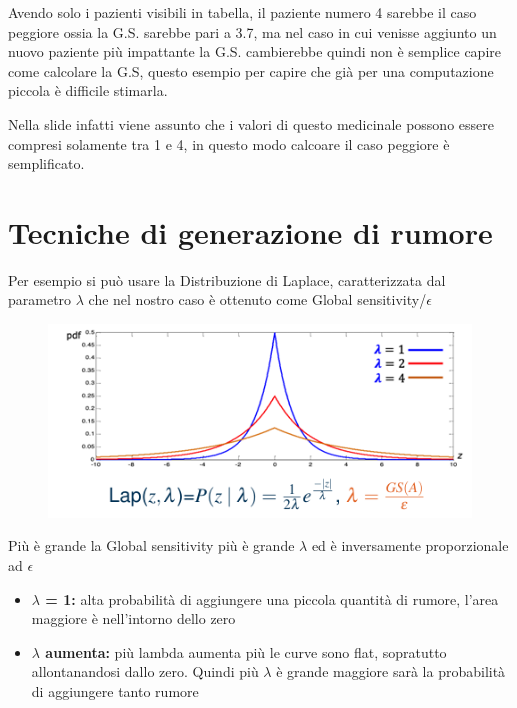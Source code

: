 \documentclass{report}
\begin{document}
\noindent Avendo solo i pazienti visibili in tabella, il paziente numero 4 sarebbe il caso peggiore ossia la G.S. sarebbe pari a 3.7, ma nel caso in cui venisse aggiunto un nuovo paziente
più impattante la G.S. cambierebbe quindi non è semplice capire come calcolare la G.S, questo esempio per capire che già per una computazione piccola è difficile stimarla.

\noindent Nella slide infatti viene assunto che i valori di questo medicinale possono essere compresi solamente tra 1 e 4, in questo modo calcoare il caso peggiore è semplificato.

\section{Tecniche di generazione di rumore}
Per esempio si può usare la Distribuzione di Laplace, caratterizzata dal parametro $\lambda$ che nel nostro caso 
è ottenuto come Global sensitivity/$\epsilon$

\begin{figure}[H]
        \centering
        \includegraphics[width=0.4\linewidth]{images/Laplace.png}
    \end{figure}
\noindent Più è grande la Global sensitivity più è grande $\lambda$ ed è inversamente proporzionale ad $\epsilon$ 
\begin{itemize}
    \item \textbf{$\lambda$ = 1:} alta probabilità di aggiungere una piccola quantità di rumore, l'area maggiore è nell'intorno dello zero
    \item \textbf{$\lambda$ aumenta:} più lambda aumenta più le curve sono flat, sopratutto allontanandosi dallo zero. Quindi più $\lambda$ è grande maggiore sarà la probabilità di aggiungere tanto rumore 
\end{itemize}
\end{document}
